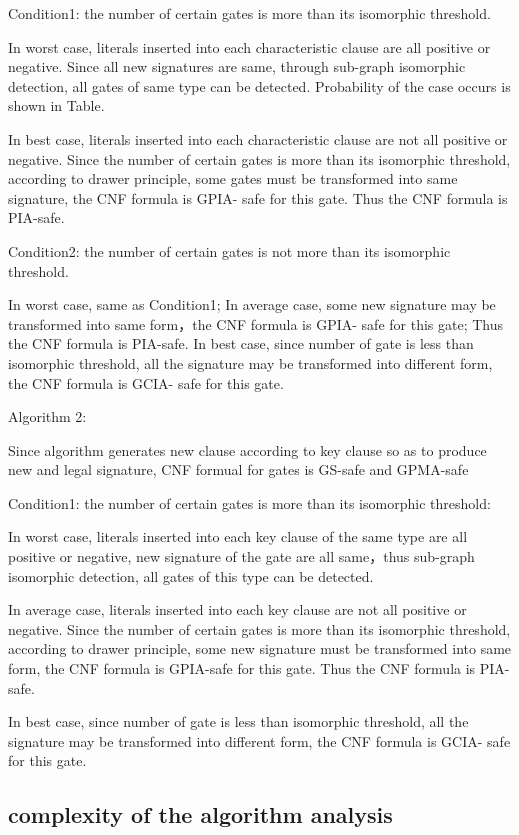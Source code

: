 \documentclass[runningheads,a4paper]{llncs}
\begin{document}
Condition1: the number of certain gates is more than its isomorphic threshold.

In worst case, literals inserted into each characteristic clause are all positive or negative. Since all new signatures are same, through sub-graph isomorphic detection, all gates of same type can be detected. Probability of the case occurs is shown in Table.

In best case, literals inserted into each characteristic clause are not all positive or negative. Since the number of certain gates is more than its isomorphic threshold, according to drawer principle, some gates must be transformed into same signature, the CNF formula is GPIA- safe for this gate. Thus the CNF formula is PIA-safe.

Condition2: the number of certain gates is not more than its isomorphic threshold.

In worst case, same as Condition1; In average case, some new signature may be transformed into same form，the CNF formula is GPIA- safe for this gate; Thus the CNF formula is PIA-safe. In best case, since number of gate is less than isomorphic threshold, all the signature may be transformed into different form, the CNF formula is GCIA- safe for this gate.

\noindent Algorithm 2:
    
Since algorithm generates new clause according to key clause so as to produce new and legal signature, CNF formual for gates is GS-safe and GPMA-safe

Condition1: the number of certain gates is more than its isomorphic threshold:

In worst case, literals inserted into each key clause of the same type are all positive or negative, new signature of the gate are all same，thus sub-graph isomorphic detection, all gates of this type can be detected.

In average case, literals inserted into each key clause are not all positive or negative. Since the number of certain gates is more than its isomorphic threshold, according to drawer principle, some new signature must be transformed into same form, the CNF formula is GPIA-safe for this gate. Thus the CNF formula is PIA-safe. 

In best case, since number of gate is less than isomorphic threshold, all the signature may be transformed into different form, the CNF formula is GCIA- safe for this gate.
\subsection{complexity of the algorithm analysis} 
\end{document}
